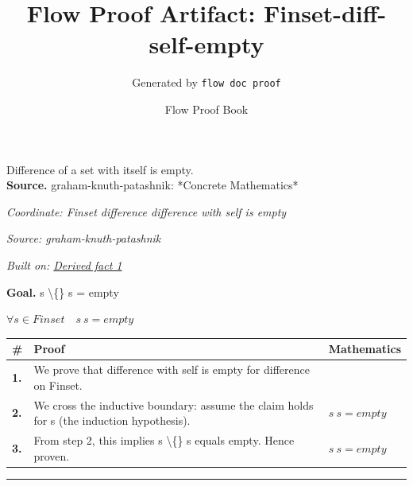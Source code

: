 \documentclass[11pt]{article}
\title{Flow Proof Artifact: Finset-diff-self-empty}
\author{Generated by \texttt{flow doc proof}}
\date{Flow Proof Book}
\theoremstyle{definition}
\begin{document}
\maketitle
Difference of a set with itself is empty.\\[0.5em]
\textbf{Source.} graham-knuth-patashnik: *Concrete Mathematics*\\[0.5em]
\bigskip
{}\par
\smallskip\noindent\textit{Coordinate: Finset \cdot difference \cdot difference with self is empty}\par
\smallskip\noindent\textit{Source: graham-knuth-patashnik}\par
\smallskip\noindent\textit{Built on: \hyperref[thm:Finset-difference-difference_with_self_is_empty]{Derived fact 1}}\par
\medskip
\noindent\textbf{Goal.} s \textbackslash\{\} s = empty\par
\noindent$\displaystyle \forall s \in Finset\quad s \ s = empty$\par
\medskip
\noindent
\begin{tabular}{@{} >{\raggedright\arraybackslash}p{} >{\raggedright\arraybackslash}p{} >{\raggedleft\arraybackslash}p{} @{}}
\textbf{\#} & \textbf{Proof} & \textbf{Mathematics} \\
\midrule
\textbf{1.} & We prove that difference with self is empty for difference on Finset. & \\[0.45em]
\textbf{2.} & We cross the inductive boundary: assume the claim holds for s (the induction hypothesis). & $\displaystyle s \ s = empty$ \\[0.45em]
\textbf{3.} & From step 2, this implies s \textbackslash\{\} s equals empty. Hence proven. & $\displaystyle s \ s = empty$ \\[0.45em]
\bottomrule
\end{tabular}
\label{thm:Finset-difference-difference_with_self_is_empty}
\par\medskip\hrule
\end{document}

